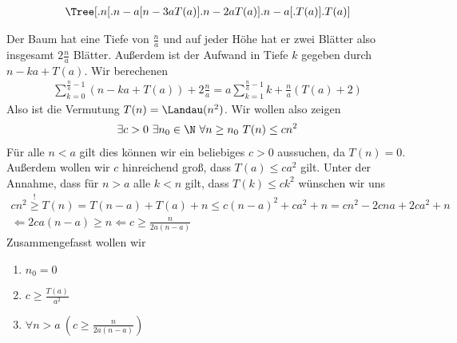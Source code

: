 \begin{solution}

	\begin{align*}
	\Tree [.n [.n-a [ n-3a T(a) ].n-2a T(a) ].n-a [.T(a) ].T(a) ]
	\end{align*}

	Der Baum hat eine Tiefe von $\frac{n}{a}$ und auf jeder Höhe hat er zwei Blätter also insgesamt $2\frac{n}{a}$ Blätter. Außerdem ist der Aufwand in Tiefe $k$ gegeben durch $n - ka + T(a)$. Wir berechenen
	\begin{align*}
	\sum_{k=0}^{\frac{n}{a} - 1} (n - ka + T(a)) + 2 \frac{n}{a} = a \sum_{k = 1}^{\frac{n}{a} - 1} k + \frac{n}{a} (T(a) + 2)
	\end{align*}
	Also ist die Vermutung $T(n) = \Landau(n^2)$. Wir wollen also zeigen
	\begin{align*}
	\exists c >0 \ \exists n_0 \in \N \ \forall n \geq n_0 \ T(n) \leq c n^2
	\end{align*}
	Für alle $n < a$ gilt dies können wir ein beliebiges $c > 0$ aussuchen, da $T(n) = 0$. Außerdem wollen wir $c$ hinreichend groß, dass $T(a) \leq c a^2$ gilt. Unter der Annahme, dass für $n > a$ alle $k < n$ gilt, dass $T(k) \leq c k^2$ wünschen wir uns
	\begin{align*}
	c n^2 \stackrel{!}{\geq} T(n) = T(n - a) + T(a) + n \leq c(n - a)^2 + ca^2 + n = cn^2 - 2cna + 2ca^2 + n \\ 
	\Leftarrow 2ca(n - a) \geq n \Leftarrow c \geq \frac{n}{2a(n - a)}
	\end{align*}
	Zusammengefasst wollen wir
	\begin{enumerate}
		\item $n_0 = 0$
		\item $c \geq \frac{T(a)}{a^2}$
		\item $\forall n > a \ (c \geq \frac{n}{2a(n - a)})$
	\end{enumerate}
\end{solution}


